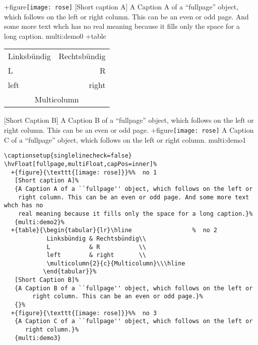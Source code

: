 \documentclass[twoside]{scrartcl}
\begin{document}
\hvFloat[fullpage,multiFloat,capPos=inner]%
  +{figure}{\texttt{[image: rose]}}%
   [Short caption A]%
   {A Caption A of a ``fullpage'' object, which follows on the left or
    right column. This can be an even or odd page. And some more text whch has no
    real meaning because it fills only the space for a long caption.}%
   {multi:demo0}%
  +{table}{\begin{tabular}{lr}\hline                 %
            Linksbündig & Rechtsbündig\\
            L           & R           \\
            left        & right       \\
            \multicolumn{2}{c}{Multicolumn}\\\hline
           \end{tabular}}%
   [Short Caption B]%
   {A Caption B of a ``fullpage'' object, which follows on the left or
        right column. This can be an even or odd page.}%
   {}%
  +{figure}{\texttt{[image: rose]}}%
   {A Caption C of a ``fullpage'' object, which follows on the left or
      right column.}%
   {multi:demo1}


\Blindtext
\Blindtext




\begin{lstlisting}
\captionsetup{singlelinecheck=false}
\hvFloat[fullpage,multiFloat,capPos=inner]%
  +{figure}{\texttt{[image: rose]}}%%  no 1
   [Short caption A]%
   {A Caption A of a ``fullpage'' object, which follows on the left or
    right column. This can be an even or odd page. And some more text whch has no
    real meaning because it fills only the space for a long caption.}%
   {multi:demo2}%
  +{table}{\begin{tabular}{lr}\hline                 %  no 2
            Linksbündig & Rechtsbündig\\
            L           & R           \\
            left        & right       \\
            \multicolumn{2}{c}{Multicolumn}\\\hline
           \end{tabular}}%
   [Short Caption B]%
   {A Caption B of a ``fullpage'' object, which follows on the left or
        right column. This can be an even or odd page.}%
   {}%
  +{figure}{\texttt{[image: rose]}}%%  no 3
   {A Caption C of a ``fullpage'' object, which follows on the left or
      right column.}%
   {multi:demo3}
\end{lstlisting}
\end{document}
